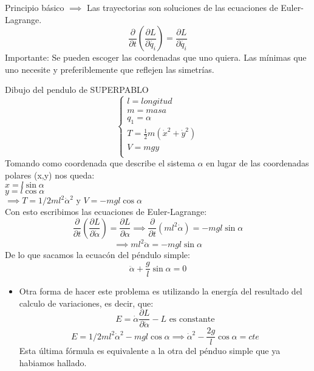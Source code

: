 Principio básico $\implies$ Las trayectorias son soluciones de las ecuaciones de Euler-Lagrange. $$\frac{\partial}{\partial t}\left(\frac{\partial L}{\partial\dot{q_i}}\right) = \frac{\partial L}{\partial \dot{q_i}}$$
Importante: Se pueden escoger las coordenadas que uno quiera. Las mínimas que uno necesite y preferiblemente que reflejen las simetrías.
\begin{example}
Dibujo del pendulo de SUPERPABLO
	$$\begin{cases}
		l= longitud\\
		m=masa\\
		q_1=\alpha\\
		T = \frac{1}{2} m (\dot x^2 + \dot y^2)\\
		V=mgy\\
	\end{cases}$$
	Tomando como coordenada que describe el sistema $\alpha$ en lugar de las coordenadas polares (x,y) nos queda:\\
	$x=l\sin\alpha$\\
	$y=l\cos\alpha$\\
	$\implies T = 1/2 m l^2 \dot\alpha^2 \text{ y } V = -m g l \cos\alpha$\\
	Con esto escribimos las ecuaciones de Euler-Lagrange:\\
	$$\frac{\partial}{\partial t}\left(\frac{\partial L}{\partial \dot\alpha}\right) = \frac{\partial L}{\partial\alpha} \implies \frac{\partial}{\partial t}(m l^2 \dot\alpha) = -m g l\sin\alpha$$
	$$\implies ml^2\ddot\alpha = -m g l \sin\alpha$$
	De lo que sacamos la ecuacón del péndulo simple:
	$$\ddot\alpha + \frac{g}{l} \sin\alpha = 0$$
	\begin{itemize}
	\item Otra forma de hacer este problema es utilizando la energía del resultado del calculo de variaciones, es decir, que:
	$$E = \dot\alpha \frac{\partial L}{\partial\dot\alpha} - L \text{  es constante}$$
	$$E = 1/2 m l^2\dot\alpha^2 - mgl\cos\alpha \implies \dot\alpha^2 - \frac{2g}{l}\cos\alpha = cte$$
	Esta última fórmula es equivalente a la otra del pénduo simple que ya habiamos hallado.
	\end{itemize}
\end{example}

